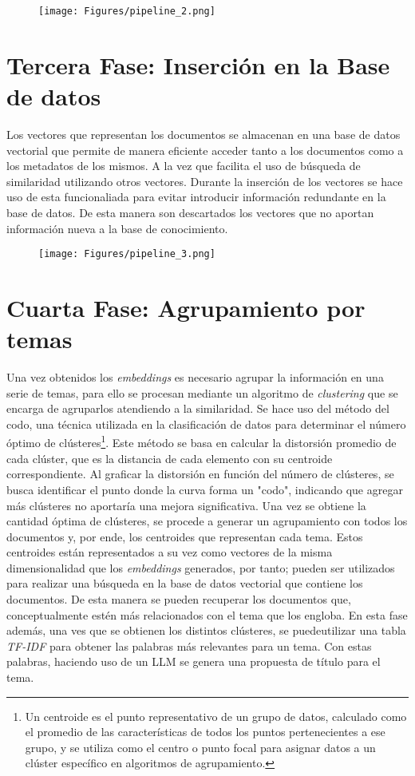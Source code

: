     \begin{figure}[H]    
        \centering
        \texttt{[image: Figures/pipeline\_2.png]}
        \caption*{}
    \end{figure}

    \section{Tercera Fase: Inserción en la Base de datos}
    Los vectores que representan los documentos se almacenan en una base de datos vectorial que permite de manera eficiente acceder tanto a los documentos como a los metadatos de los mismos. A la vez que facilita el uso de búsqueda de similaridad utilizando otros vectores. Durante la inserción de los vectores se hace uso de esta funcionaliada para evitar introducir información redundante en la base de datos. De esta manera son descartados los vectores que no aportan información nueva a la base de conocimiento.

    \begin{figure}[H]    
        \centering
        \texttt{[image: Figures/pipeline\_3.png]}
        \caption*{}
    \end{figure}

    \section{Cuarta Fase: Agrupamiento por temas}
    Una vez obtenidos los \emph{embeddings} es necesario agrupar la información en una serie de temas, para ello se procesan mediante un algoritmo de \emph{clustering} que se encarga de agruparlos atendiendo a la similaridad. Se hace uso del método del codo, una técnica utilizada en la clasificación de datos para determinar el número óptimo de clústeres\footnote{Un centroide es el punto representativo de un grupo de datos, calculado como el promedio de las características de todos los puntos pertenecientes a ese grupo, y se utiliza como el centro o punto focal para asignar datos a un clúster específico en algoritmos de agrupamiento.}. Este método se basa en calcular la distorsión promedio de cada clúster, que es la distancia de cada elemento con su centroide correspondiente. Al graficar la distorsión en función del número de clústeres, se busca identificar el punto donde la curva forma un "codo", indicando que agregar más clústeres no aportaría una mejora significativa. Una vez se obtiene la cantidad óptima de clústeres, se procede a generar un agrupamiento con todos los documentos y, por ende, los centroides que representan cada tema. Estos centroides están representados a su vez como vectores de la misma dimensionalidad que los \emph{embeddings} generados, por tanto; pueden ser utilizados para realizar una búsqueda en la base de datos vectorial que contiene los documentos. De esta manera se pueden recuperar los documentos que, conceptualmente estén más relacionados con el tema que los engloba. En esta fase además, una ves que se obtienen los distintos clústeres, se puedeutilizar una tabla \emph{TF-IDF} para obtener las palabras más relevantes para un tema. Con estas palabras, haciendo uso de un LLM se genera una propuesta de título para el tema.


